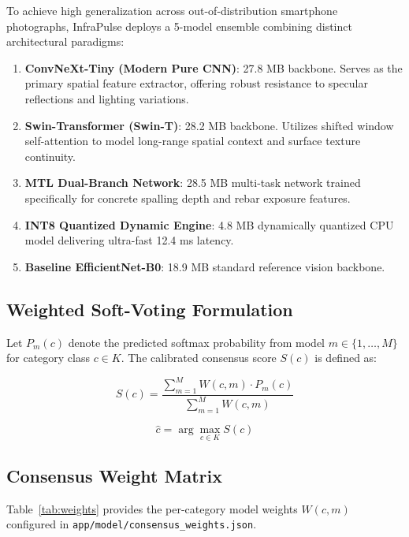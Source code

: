 \documentclass[11pt,a4paper]{article}
\begin{document}
To achieve high generalization across out-of-distribution smartphone photographs, InfraPulse deploys a 5-model ensemble combining distinct architectural paradigms:
\begin{enumerate}
    \item \textbf{ConvNeXt-Tiny (Modern Pure CNN)}: 27.8 MB backbone. Serves as the primary spatial feature extractor, offering robust resistance to specular reflections and lighting variations.
    \item \textbf{Swin-Transformer (Swin-T)}: 28.2 MB backbone. Utilizes shifted window self-attention to model long-range spatial context and surface texture continuity.
    \item \textbf{MTL Dual-Branch Network}: 28.5 MB multi-task network trained specifically for concrete spalling depth and rebar exposure features.
    \item \textbf{INT8 Quantized Dynamic Engine}: 4.8 MB dynamically quantized CPU model delivering ultra-fast 12.4 ms latency.
    \item \textbf{Baseline EfficientNet-B0}: 18.9 MB standard reference vision backbone.
\end{enumerate}

\subsection{Weighted Soft-Voting Formulation}
Let $P_m(c)$ denote the predicted softmax probability from model $m \in \{1, \dots, M\}$ for category class $c \in K$. The calibrated consensus score $S(c)$ is defined as:

\begin{equation}
S(c) = \frac{\sum_{m=1}^{M} W(c, m) \cdot P_m(c)}{\sum_{m=1}^{M} W(c, m)}
\end{equation}

\begin{equation}
\hat{c} = \arg\max_{c \in K} S(c)
\end{equation}

\subsection{Consensus Weight Matrix}
Table~\ref{tab:weights} provides the per-category model weights $W(c, m)$ configured in \texttt{app/model/consensus_weights.json}.
\end{document}

